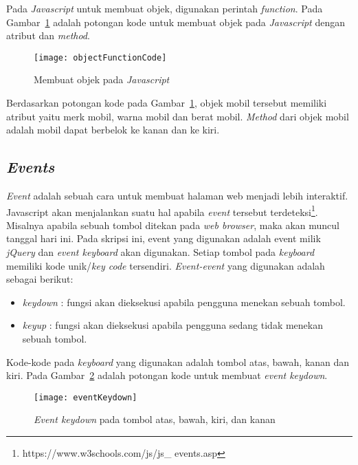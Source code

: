 Pada \textit{Javascript} untuk membuat objek, digunakan perintah \textit{function}. Pada Gambar~\ref{fig:objectFunctionCode} adalah potongan kode untuk membuat objek pada \textit{Javascript} dengan atribut dan \textit{method}.

\begin{figure}[H]
	\centering  
	\texttt{[image: objectFunctionCode]}
	\caption[Membuat objek pada \textit{Javascript}]{Membuat objek pada \textit{Javascript}}
	\label{fig:objectFunctionCode} 
\end{figure} 

Berdasarkan potongan kode pada Gambar~\ref{fig:objectFunctionCode}, objek mobil tersebut memiliki atribut yaitu merk mobil, warna mobil dan berat mobil. \textit{Method} dari objek mobil adalah mobil dapat berbelok ke kanan dan ke kiri.

\subsection{\textit{Events}}
\textit{Event} adalah sebuah cara untuk membuat halaman web menjadi lebih interaktif. Javascript akan menjalankan suatu hal apabila \textit{event} tersebut terdeteksi\footnote{https://www.w3schools.com/js/js\_ events.asp}. Misalnya apabila sebuah tombol ditekan pada \textit{web browser}, maka akan muncul tanggal hari ini.  Pada skripsi ini, event yang digunakan adalah event milik \textit{jQuery} dan \textit{event keyboard} akan digunakan. Setiap tombol pada \textit{keyboard} memiliki kode unik/\textit{key code} tersendiri. \textit{Event-event} yang digunakan adalah sebagai berikut:

\begin{itemize}
	\item \textit{keydown} : fungsi akan dieksekusi apabila pengguna menekan sebuah tombol.
	\item \textit{keyup} : fungsi akan dieksekusi apabila pengguna sedang tidak menekan sebuah tombol.
\end{itemize}

Kode-kode pada \textit{keyboard} yang digunakan adalah tombol atas, bawah, kanan dan kiri. Pada Gambar~\ref{fig:eventKeyDown} adalah potongan kode untuk membuat \textit{event keydown}.

\begin{figure}[H]
	\centering  
	\texttt{[image: eventKeydown]}
	\caption[\textit{Event keydown} pada tombol atas, bawah, kiri, dan kanan]{\textit{Event keydown} pada tombol atas, bawah, kiri, dan kanan}
	\label{fig:eventKeyDown} 
\end{figure} 


